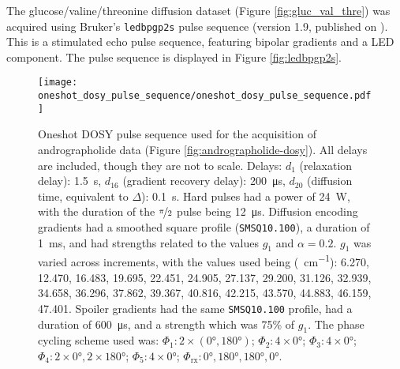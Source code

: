 

The glucose/valine/threonine diffusion dataset (Figure \ref{fig:gluc_val_thre})
was acquired using Bruker's \texttt{ledbpgp2s} pulse sequence (version 1.9, published on
). This is a stimulated echo pulse sequence, featuring
bipolar gradients and a \ac{LED} component\cite{Wu1995}. The pulse sequence is
displayed in Figure \ref{fig:ledbpgp2s}.

\begin{figure}[H]
    \centering
    \texttt{[image: oneshot\_dosy\_pulse\_sequence/oneshot\_dosy\_pulse\_sequence.pdf]}
    \caption[
        Oneshot \acs{DOSY} pulse sequence used for the acquisition of
        andrographolide data.
    ]{
        Oneshot \ac{DOSY} pulse sequence used for the acquisition of
        andrographolide data (Figure \ref{fig:andrographolide-dosy}). All
        delays are included, though they are not to scale.
        Delays:
        $d_1$ (relaxation delay): \qty{1.5}{\second},
        $d_{16}$ (gradient recovery delay): \qty{200}{\micro\second},
        $d_{20}$ (diffusion time, equivalent to $\Delta$): \qty{0.1}{\second}.
        Hard pulses had a power of \qty{24}{\watt},
        with the duration of the $\nicefrac{\pi}{2}$ pulse being
        \qty{12}{\micro\second}.
        Diffusion encoding gradients had a smoothed square profile
        (\texttt{SMSQ10.100}), a duration of \qty{1}{\milli\second}, and had
        strengths related to the values $g_1$ and $\alpha = 0.2$.
        $g_1$ was varied across increments, with the values used
        being (\unit{\gauss \per \centi \meter}):
        6.270,
        12.470,
        16.483,
        19.695,
        22.451,
        24.905,
        27.137,
        29.200,
        31.126,
        32.939,
        34.658,
        36.296,
        37.862,
        39.367,
        40.816,
        42.215,
        43.570,
        44.883,
        46.159,
        47.401.
        Spoiler gradients had the same \texttt{SMSQ10.100} profile, had a
        duration of \qty{600}{\micro\second}, and a strength which was 75\% of
        $g_1$.
        The phase cycling scheme used was:
        $\Phi_1: 2 \times (\ang{0}, \ang{180})$;
        $\Phi_2: 4 \times \ang{0}$;
        $\Phi_3: 4 \times \ang{0}$;
        $\Phi_4: 2 \times \ang{0}, 2 \times \ang{180}$;
        $\Phi_5: 4 \times \ang{0}$;
        $\Phi_{\text{rx}}: \ang{0}, \ang{180}, \ang{180}, \ang{0}$.
    }
    \label{fig:oneshot-dosy}
\end{figure}

